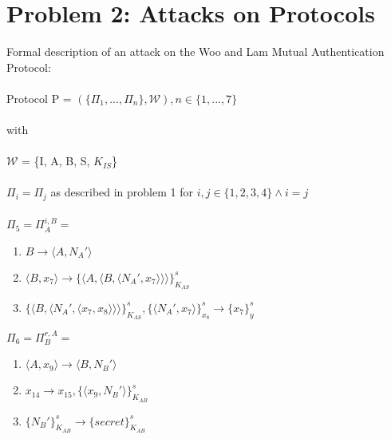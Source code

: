 \documentclass[12pt,pdftex,a4paper]{article}
\newcommand\tab[1][1cm]{\hspace*{#1}}
\begin{document}
\newpage
\section*{Problem 2: Attacks on Protocols}
Formal description of an attack on the Woo and Lam Mutual Authentication Protocol:\\~\\
Protocol P = $(\{\Pi_1, ..., \Pi_n\}, \mathcal{W}), n \in \{1,...,7\}$ \\~\\
with\\~\\
$\mathcal{W}$ = \{I, A, B, S, $K_{IS}$\}\\~\\
$\Pi_i = \Pi_j$ as described in problem 1 for $i,j\in \{1,2,3,4\}\land i=j$ %
\\~\\

$\Pi_5 = \Pi_A^{i,B} =$
\begin{enumerate}
	\item \tab $ B \rightarrow \langle A, N_A'\rangle $
	\item \tab $ \langle B, x_7 \rangle \rightarrow \{\langle A, \langle B, \langle N_A', x_7\rangle\rangle\rangle\}_{K_{AS}}^s$	
	\item \tab $ \{\langle B,\langle N_A', \langle x_7, x_8\rangle\rangle\rangle\}_{K_{AS}}^{s}, \{\langle N_A', x_7\rangle\}_{x_8}^s \rightarrow \{x_7\}_y^s $
\end{enumerate}

$\Pi_6 = \Pi_B^{r,A} =$
\begin{enumerate}
\item \tab $\langle A, x_9\rangle \rightarrow \langle B, N_B' \rangle$
\item \tab $x_{14} \rightarrow x_{15}, \{\langle x_9, N_B'\rangle\}_{K_{AB}}^s$
\item \tab $ \{N_B'\}_{K_{AB}}^s \rightarrow \{secret\}_{K_{AB}}^s$
\end{enumerate}
\end{document}
